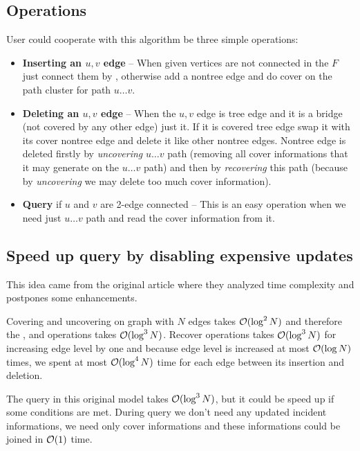 \subsection{Operations}
User could cooperate with this algorithm be three simple operations:

\begin{itemize}
\item {\bf Inserting an $u,v$ edge} -- When given vertices are not connected in
the $F$ just connect them by \Join, otherwise add a nontree edge and do cover on
the path cluster for path $u\dots v$.

\item {\bf Deleting an $u,v$ edge} -- When the $u,v$ edge is tree edge and it is
a bridge (not covered by any other edge) just \Cut{} it. If it is covered tree
edge swap it with its cover nontree edge and delete it like other nontree edges.
Nontree edge is deleted firstly by {\it uncovering} $u\dots v$ path (removing all
cover informations that it may generate on the $u\dots v$ path) and then by
{\it recovering} this path (because by {\it uncovering} we may delete too much
cover information).

\item {\bf Query} if $u$ and $v$ are 2-edge connected -- This is an easy
operation when we need just \Expose{} $u\dots v$ path and read the cover
information from it.
\end{itemize}

\subsection{Speed up query by disabling expensive updates}

This idea came from the original article \cite{PolylogarithmicAlgorithmsForConnectivity}
where they analyzed time complexity and postpones some enhancements.

Covering and uncovering on graph with $N$ edges takes ${\cal O}(\log^2 N)$ and
therefore the \Link, \Cut{} and \Expose operations takes ${\cal O}(\log^3 N)$. Recover
operations takes ${\cal O}(\log^3 N)$ for increasing edge level by one and because
edge level is increased at most ${\cal O}(\log N)$ times, we spent at most
${\cal O}(\log^4 N)$ time for each edge between its insertion and deletion.

The query in this original model takes ${\cal O}(\log^3 N)$, but it could be speed up
if some conditions are met. During query we don't need any updated incident
informations, we need only cover informations and these informations could be
joined in ${\cal O}(1)$ time.


